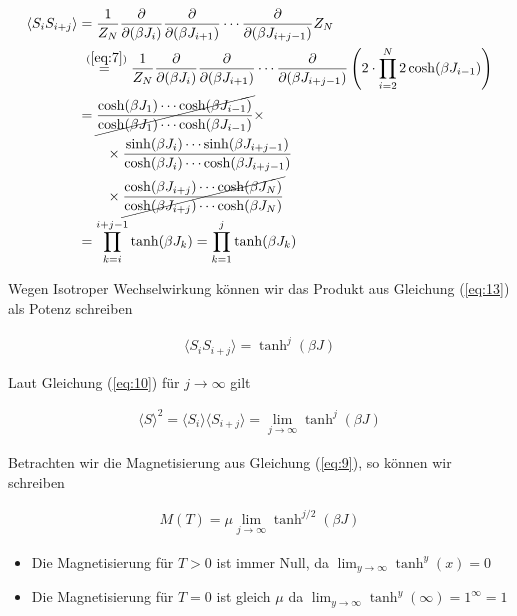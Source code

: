\begin{align}
  \label{eq:13}
  \langle S_iS_{i+j}\rangle &=  \frac{1}{Z_N} \pdiff_{(\beta J_i)}\pdiff_{(\beta J_{i+1})}\cdots \pdiff_{(\beta J_{i+j-1})} Z_N \notag\\
&\stackrel{~(\ref{eq:7})}=  \frac{1}{Z_N} \pdiff_{(\beta J_i)}\pdiff_{(\beta J_{i+1})}\cdots \pdiff_{(\beta J_{i+j-1})} \left(2\cdot\prod_{i=2}^N2\cosh( \beta J_{i-1})\right)  \notag\\
&=\cancel{\frac{\cosh(\beta J_{1})\cdots \cosh(\beta J_{i-1})}{ \cosh(\beta J_{1})\cdots \cosh(\beta J_{i-1})} } \times\notag \\
&\qquad\times \frac{ \sinh(\beta J_{i})\cdots\sinh(\beta J_{i+j-1})}{\cosh(\beta J_{i})\cdots\cosh(\beta J_{i+j-1})}\notag \\
&\qquad \times \cancel{ \frac{  \cosh(\beta J_{i+j}) \cdots \cosh(\beta J_{N})  }{   \cosh(\beta J_{i+j}) \cdots \cosh(\beta J_{N}) }} \notag\\
%
&=\prod_{k=i}^{i+j-1} \tanh(\beta J_{k}) = \prod_{k=1}^{j} \tanh(\beta J_{k})
\end{align}

Wegen Isotroper Wechselwirkung können wir das Produkt aus Gleichung (\ref{eq:13}) als Potenz schreiben

\begin{align}
  \label{eq:14}
   \langle S_iS_{i+j}\rangle =  \tanh^j(\beta J)
\end{align}

Laut Gleichung (\ref{eq:10}) für \(j\to\infty\) gilt

\begin{align}
  \label{eq:15}
\langle S \rangle^2 =  \langle S_i\rangle\langle S_{i+j}\rangle = \lim_{j\to\infty} \tanh^j(\beta J)
\end{align}

Betrachten wir die Magnetisierung aus Gleichung (\ref{eq:9}), so können wir schreiben

\begin{align}
  \label{eq:16}
  \boxed{ M(T) = \mu \lim_{j\to\infty} \tanh^{j/2}(\beta J) }
\end{align}

\begin{itemize}
\item Die Magnetisierung für \(T>0\) ist immer Null, da \(\lim_{y\to\infty}\tanh^y(x)=0\)
\item Die Magnetisierung für \(T=0\) ist gleich \(\mu\) da \(\lim_{y\to\infty}\tanh^y(\infty)=1^\infty=1\)
\end{itemize}

